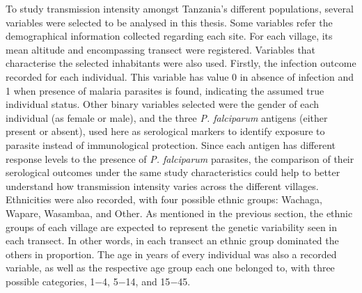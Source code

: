 To study transmission intensity amongst Tanzania's different populations, several variables were selected to be analysed in this thesis.
Some variables refer the demographical information collected regarding each site.
For each village, its mean altitude and encompassing transect were registered.
Variables that characterise the selected inhabitants were also used.
Firstly, the infection outcome recorded for each individual.
This variable has value 0 in absence of infection and 1 when presence of malaria parasites is found, indicating the assumed true individual status.
Other binary variables selected were the gender of each individual (as female or male), and the three \textit{P. falciparum} antigens (either present or absent), used here as serological markers to identify exposure to parasite instead of immunological protection.
Since each antigen has different response levels to the presence of \textit{P. falciparum} parasites, the comparison of their serological outcomes under the same study characteristics could help to better understand how transmission intensity varies across the different villages.
Ethnicities were also recorded, with four possible ethnic groups: Wachaga, Wapare, Wasambaa, and Other.
As mentioned in the previous section, the ethnic groups of each village are expected to represent the genetic variability seen in each transect.
In other words, in each transect an ethnic group dominated the others in proportion.
The age in years of every individual was also a recorded variable, as well as the respective age group each one belonged to, with three possible categories, 1$-$4, 5$-$14, and 15$-$45.

